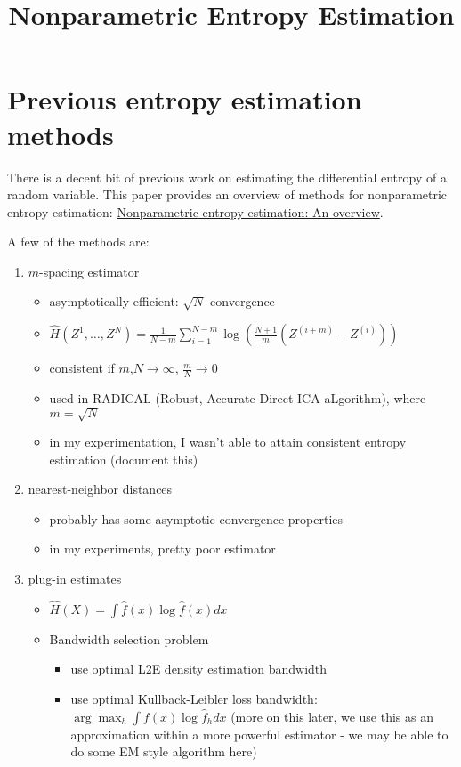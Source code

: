 \documentclass{article}
\title{Nonparametric Entropy Estimation}
\begin{document}
\maketitle

\section{Previous entropy estimation methods}

There is a decent bit of previous work on estimating the differential entropy of a random variable. This paper provides an overview of methods for nonparametric entropy estimation: \href{http://ecf.caltech.edu/summerlecture/docs/Entropy\%20estimation.pdf}{Nonparametric entropy estimation: An overview}.


A few of the methods are:
\begin{enumerate}
\item $m$-spacing estimator
  \begin{itemize}
    \item asymptotically efficient: $\sqrt{N}$ convergence
    \item $ \hat{H}(Z^1,\ldots,Z^N) =  \frac{1}{N-m} \sum_{i=1}^{N-m} \log \left( \frac{N+1}{m}(Z^{(i+m)} - Z^{(i)}) \right) $
    \item consistent if $m$,$N \rightarrow \infty$, $\frac{m}{N} \rightarrow 0$
    \item used in RADICAL (Robust, Accurate Direct ICA aLgorithm), where $m = \sqrt{N} $
    \item in my experimentation, I wasn't able to attain consistent entropy estimation (document this)
  \end{itemize}
\item nearest-neighbor distances
  \begin{itemize}
  \item probably has some asymptotic convergence properties
  \item in my experiments, pretty poor estimator
  \end{itemize}
\item plug-in estimates
  \begin{itemize}
  \item $ \hat{H}(X) = \int \hat{f}(x) \log \hat{f}(x) dx $
  \item Bandwidth selection problem
    \begin{itemize}
    \item use optimal L2E density estimation bandwidth
    \item use optimal Kullback-Leibler loss bandwidth: $\arg \max_h \int f(x) \log \hat{f}_h dx $ (more on this later, we use this as an approximation within a more powerful estimator - we may be able to do some EM style algorithm here)
    \end{itemize}
  \end{itemize}
\end{enumerate}
\end{document}
